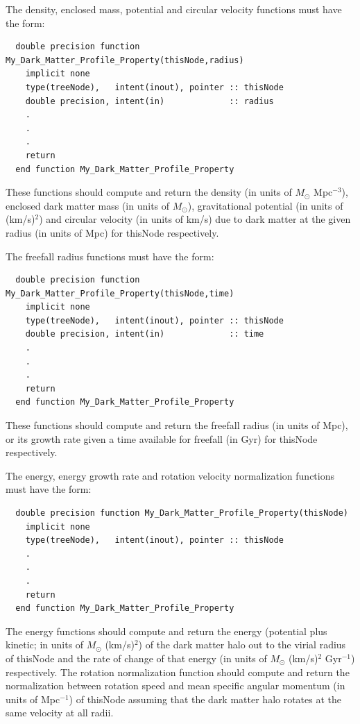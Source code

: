 The density, enclosed mass, potential and circular velocity functions must have the form:
\begin{verbatim}
  double precision function My_Dark_Matter_Profile_Property(thisNode,radius)
    implicit none
    type(treeNode),   intent(inout), pointer :: thisNode
    double precision, intent(in)             :: radius
    .
    .
    .
    return
  end function My_Dark_Matter_Profile_Property
\end{verbatim}
These functions should compute and return the density (in units of $M_\odot$ Mpc$^{-3}$), enclosed dark matter mass (in units of $M_\odot$), gravitational potential (in units of (km/s)$^2$) and circular velocity (in units of km/s) due to dark matter at the given {\normalfont \ttfamily radius} (in units of Mpc) for {\normalfont \ttfamily thisNode} respectively.

The freefall radius functions must have the form:
\begin{verbatim}
  double precision function My_Dark_Matter_Profile_Property(thisNode,time)
    implicit none
    type(treeNode),   intent(inout), pointer :: thisNode
    double precision, intent(in)             :: time
    .
    .
    .
    return
  end function My_Dark_Matter_Profile_Property
\end{verbatim}
These functions should compute and return the freefall radius (in units of Mpc), or its growth rate given a {\normalfont \ttfamily time} available for freefall (in Gyr) for {\normalfont \ttfamily thisNode} respectively.

The energy, energy growth rate and rotation velocity normalization functions must have the form:
\begin{verbatim}
  double precision function My_Dark_Matter_Profile_Property(thisNode)
    implicit none
    type(treeNode),   intent(inout), pointer :: thisNode
    .
    .
    .
    return
  end function My_Dark_Matter_Profile_Property
\end{verbatim}
The energy functions should compute and return the energy (potential plus kinetic; in units of $M_\odot$ (km/s)$^2$) of the dark matter halo out to the virial radius of {\normalfont \ttfamily thisNode} and the rate of change of that energy (in units of $M_\odot$ (km/s)$^2$ Gyr$^{-1}$) respectively. The rotation normalization function should compute and return the normalization between rotation speed and mean specific angular momentum (in units of Mpc$^{-1}$) of {\normalfont \ttfamily thisNode} assuming that the dark matter halo rotates at the same velocity at all radii.

